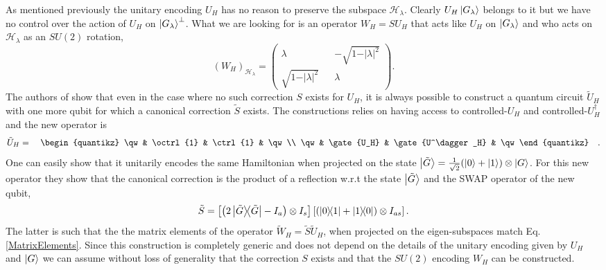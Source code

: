 \documentclass[a4paper,11pt]{article}
\begin{document}
As mentioned previously the unitary encoding $U_H$ has no reason to preserve the subspace $\mathcal{H}_\lambda$. Clearly $U_H\ket{G_\lambda}$ belongs to it but we have no control over the action of $U_H$ on $\ket{G_\lambda}^\perp$. What we are looking for is an operator $W_H = SU_H$ that acts like $U_H$ on $\ket{G_\lambda}$ and who acts on $\mathcal{H}_\lambda$ as an $SU(2)$ rotation, 
\begin{equation}
    (W_H)_{\mathcal{H}_\lambda} =
    \begin{pmatrix}
    \lambda && -\sqrt{1-\vert \lambda \vert^2}\\
    \sqrt{1-\vert \lambda \vert^2} && \lambda
    \end{pmatrix}.
    \label{MatrixElements}
\end{equation}
The authors of \cite{Low2019hamiltonian} show that even in the case where no such correction $S$ exists for $U_H$, it is always possible to construct a quantum circuit $\tilde{U}_H$ with one more qubit for which a canonical correction $\tilde{S}$ exists. The constructions relies on having access to controlled-$U_H$ and controlled-$U^\dagger_H$ and the new operator is 
\begin{equation}
    \tilde{U}_H = \quad
    \begin{quantikz}
     \qw   & \octrl{1}  & \ctrl{1} &  \qw 
    \\
     \qw  & \gate{U_H} & \gate{U^\dagger_H} & \qw 
    \end{quantikz}
    \quad.
\end{equation}
One can easily show that it unitarily encodes the same Hamiltonian when projected on the state $\ket{\tilde{G}} = \frac{1}{\sqrt{2}}(\ket{0}+\ket{1})\otimes \ket{G}$. For this new operator they show that the canonical correction is the product of a reflection w.r.t the state $\ket{\tilde{G}}$ and the SWAP operator of the new qubit,
\begin{equation}
    \tilde{S} = \left[\left(2\ketbra{\tilde{G}}{\tilde{G}}- I_a\right)\otimes I_s\right]\left[\left(\ketbra{0}{1}+\ketbra{1}{0}\right)\otimes I_{as}\right].
\end{equation}
The latter is such that the the matrix elements of the operator $\tilde{W}_H = \tilde{S}\tilde{U}_H$, when projected on the eigen-subspaces match Eq. \eqref{MatrixElements}. Since this construction is completely generic and does not depend on the details of the unitary encoding given by $U_H$ and $\ket{G}$ we can assume without loss of generality that the correction $S$ exists and that the $SU(2)$ encoding $W_H$ can be constructed.
\end{document}
